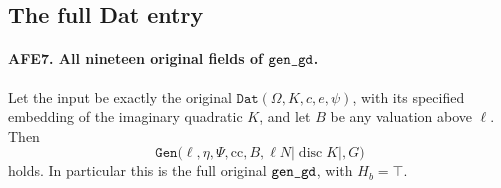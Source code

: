 \documentclass[11pt,a4paper]{article}
\numberwithin{equation}{section}
\theoremstyle{remark}\newtheorem{remark}[theorem]{Remark}
\begin{document}
\subsection{The full Dat entry}

\paragraph{AFE7. All nineteen original fields of \(\texttt{gen\_\allowbreak gd}\).}
\label{claim:AFE7}
Let the input be exactly the original
\(\texttt{Dat}(\Omega,K,c,e,\psi)\), with its specified
embedding of the imaginary quadratic \(K\), and let
\(B\) be any valuation above \(\ell\).
Then
\[
 \texttt{Gen}\bigl(\ell,\eta,\Psi,\mathrm{cc},B,
                     \ell N|\operatorname{disc}K|,G\bigr)
                                                        \tag{AFE.10}
\]
holds.  In particular this is the full original
\(\texttt{gen\_\allowbreak gd}\), with \(H_b=\top\).
\end{document}
